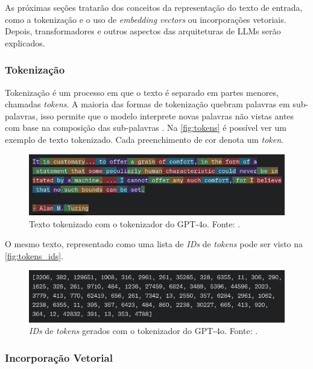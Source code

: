 As próximas seções tratarão dos conceitos da representação do texto de entrada, como a tokenização e o uso de \textit{embedding vectors} ou incorporações vetoriais.
Depois, transformadores e outros aspectos das arquiteturas de \acp{LLM} serão explicados.

\subsubsection{Tokenização}  %

Tokenização é um processo em que o texto é separado em partes menores, chamadas \textit{tokens}. A maioria das formas de tokenização quebram palavras em sub-palavras,
isso permite que o modelo interprete novas palavras não vistas antes com base na composição das sub-palavras \cite{llm_survey_2024}. Na \autoref{fig:tokens} é possível
ver um exemplo de texto tokenizado. Cada preenchimento de cor denota um \textit{token}.

\begin{figure}[ht]
      \centering
      \includegraphics[width=0.7\columnwidth,keepaspectratio]{images/tokens.png}
      \caption{\small Texto tokenizado com o tokenizador do \ac{GPT}-4o. Fonte: \textcite{tokenizer}.}
      \label{fig:tokens}
\end{figure}

O mesmo texto, representado como uma lista de \textit{IDs} de \textit{tokens} pode ser visto na \autoref{fig:tokens_ids}.

\begin{figure}[ht]
      \centering
      \includegraphics[width=0.7\columnwidth,keepaspectratio]{images/tokens_ids.png}
      \caption{\small \textit{IDs} de \textit{tokens} gerados com o tokenizador do \ac{GPT}-4o. Fonte: \textcite{tokenizer}.}
      \label{fig:tokens_ids}
\end{figure}

\subsubsection{Incorporação Vetorial}


